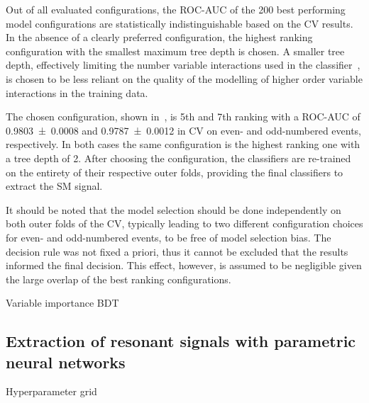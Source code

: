 Out of all evaluated configurations, the ROC-AUC of the 200 best
performing model configurations are statistically indistinguishable
based on the CV results. In the absence of a clearly preferred
configuration, the highest ranking configuration with the smallest
maximum tree depth is chosen. A smaller tree depth, effectively
limiting the number variable interactions used in the
classifier~\cite{hastie09}, is chosen to be less reliant on the
quality of the modelling of higher order variable interactions in the
training data.

The chosen configuration, shown in~,
is 5th and 7th ranking with a ROC-AUC of \num{0.9803 +- 0.0008} and
\num{0.9787 +- 0.0012} in CV on even- and odd-numbered events,
respectively. In both cases the same configuration is the highest
ranking one with a tree depth of 2. After choosing the configuration,
the classifiers are re-trained on the entirety of their respective
outer folds, providing the final classifiers to extract the SM \HH
signal.

It should be noted that the model selection should be done
independently on both outer folds of the CV, typically leading to two
different configuration choices for even- and odd-numbered events, to
be free of model selection bias. The decision rule was not fixed a
priori, thus it cannot be excluded that the results informed the final
decision. This effect, however, is assumed to be negligible given the
large overlap of the best ranking configurations.



\begin{table}[htbp]
  \centering

  \caption{Variable importance BDT}
  \label{tab:variable_importance_bdt}
\end{table}





\subsection{Extraction of resonant signals with parametric neural networks}
\label{sec:mva_pnn}


\begin{table}[htbp]
  \centering
  
  \caption{Hyperparameter grid}
  \label{tab:hyperparameter_grid_pnn}
\end{table}


